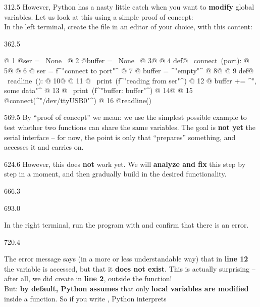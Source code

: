 \documentclass{aslab}
\newcommand*\codeix{\fontsize{9bp}{12bp}\ttfamily\lineskiplimit=-\maxdimen}
\begin{document}
\begin{region}[pitch=13.35]{312.5}
However, Python has a nasty little catch when you want to \textbf{modify}
global variables. Let us look at this using a simple proof of concept:\\
In the left terminal, create the file  in an editor of
your choice, with this content:
\end{region}

\begin{region}[pitch=12]{362.5}
\begin{codeblock}[style=py,basicstyle=\codeix]
@  1 @ser = ~None~
@  2 @buffer = ~None~
@  3@
@  4 def@ ~connect~(port):
@  5@
@  6 @    ser = f^"connect to {port}"^
@  7 @    buffer = ^"empty"^
@  8@
@  9 def@ ~readline~():
@ 10@
@ 11 @    ~print~(f^"reading from {ser}"^)
@ 12 @    buffer += ^", some data"^
@ 13 @    ~print~(f^"buffer: {buffer}"^)
@ 14@
@ 15 @connect(^"/dev/ttyUSB0"^)
@ 16 @readline()
\end{codeblock}
\end{region}

\begin{region}[pitch=13.63]{569.5}
By ``proof of concept'' we mean: we use the simplest possible example to
test whether two functions can share the same variables. The goal is
\textbf{not yet} the serial interface -- for now, the point is only that
 ``prepares'' something, and  accesses it and
carries on.
\end{region}

\begin{region}[pitch=14.2]{624.6}
However, this does \textbf{not} work yet. We will \textbf{analyze and fix}
this step by step in a moment, and then gradually build in the desired
functionality.
\end{region}

\begin{region}{666.3}
\end{region}

\begin{region}[pitch=13.3]{693.0}
\begin{ptasks}
\item In the right terminal, run the program with
   and confirm that there is an error.
\end{ptasks}
\end{region}

\begin{region}[pitch=14.3]{720.4}
\begin{ptasks}[start=2]
\item The error message says (in a more or less understandable way) that
  in \textbf{line 12} the variable  is accessed, but that it
  \textbf{does not exist}. This is actually surprising -- after all, we did
  create  in \textbf{line 2}, outside the function!\\
  But: \textbf{by default, Python assumes} that only \textbf{local
  variables are modified} inside a function. So if you write
  , Python interprets
\end{ptasks}
\end{region}
\end{document}
